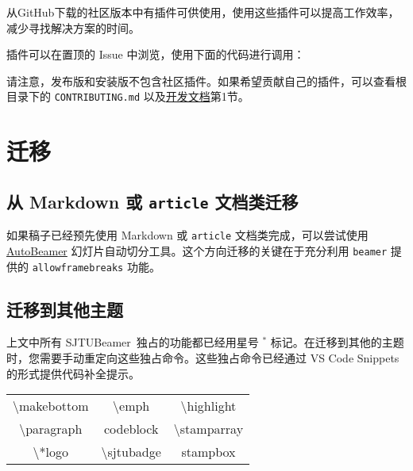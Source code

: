 \documentclass[
    UTF8,
    heading=true,
    12pt,
    a4paper
]{ctexrep}
\def\themename{\textsf{SJTUBeamer}}
\begin{document}
从GitHub下载的社区版本中有插件可供使用，使用这些插件可以提高工作效率，减少寻找解决方案的时间。

插件可以在置顶的 Issue 中浏览，使用下面的代码进行调用：

请注意，发布版和安装版不包含社区插件。如果希望贡献自己的插件，可以查看根目录下的 \verb"CONTRIBUTING.md" 以及\href{run:sjtubeamerdevguide.pdf}{开发文档}第1节。


\chapter{迁移}

\section{从 Markdown 或 \texttt{article} 文档类迁移}

如果稿子已经预先使用 Markdown 或 \texttt{article} 文档类完成，可以尝试使用 \href{https://logcreative.github.io/AutoBeamer/}{AutoBeamer} 幻灯片自动切分工具。这个方向迁移的关键在于充分利用 \texttt{beamer} 提供的 \texttt{allowframebreaks} 功能。

\section{迁移到其他主题}

上文中所有 \themename\ 独占的功能都已经用星号 $^*$ 标记。在迁移到其他的主题时，您需要手动重定向这些独占命令。这些独占命令已经通过 VS Code Snippets 的形式提供代码补全提示。

\begin{table}[h]
  \centering
  \begin{tabular}{>{\ttfamily}c>{\ttfamily}c>{\ttfamily}c}
    \hline
    \textbackslash{}makebottom & \textbackslash{}emph      & \textbackslash{}highlight  \\
    \textbackslash{}paragraph  & codeblock                 & \textbackslash{}stamparray \\
    \textbackslash{}*logo      & \textbackslash{}sjtubadge & stampbox                   \\
    \hline
  \end{tabular}
\end{table}
\end{document}
